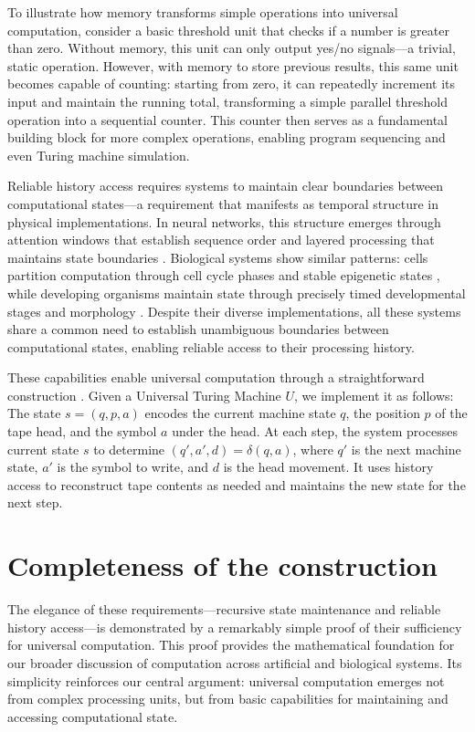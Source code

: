 \documentclass[12pt]{article}
\begin{document}
To illustrate how memory transforms simple operations into universal computation, consider a basic threshold unit that checks if a number is greater than zero.
Without memory, this unit can only output yes/no signals---a trivial, static operation.
However, with memory to store previous results, this same unit becomes capable of counting: starting from zero, it can repeatedly increment its input and maintain the running total, transforming a simple parallel threshold operation into a sequential counter.
This counter then serves as a fundamental building block for more complex operations, enabling program sequencing and even Turing machine simulation.

Reliable history access requires systems to maintain clear boundaries between computational states---a requirement that manifests as temporal structure in physical implementations.
In neural networks, this structure emerges through attention windows that establish sequence order and layered processing that maintains state boundaries \cite{martini2015information,quentin2019differential}.
Biological systems show similar patterns: cells partition computation through cell cycle phases and stable epigenetic states \cite{bruno2022epigenetic}, while developing organisms maintain state through precisely timed developmental stages and morphology \cite{turing1952chemical}.
Despite their diverse implementations, all these systems share a common need to establish unambiguous boundaries between computational states, enabling reliable access to their processing history.

These capabilities enable universal computation through a straightforward construction \cite{deutsch1995universality,bennett1989time}.
Given a Universal Turing Machine $U$, we implement it as follows: The state $s = (q, p, a)$ encodes the current machine state $q$, the position $p$ of the tape head, and the symbol $a$ under the head.
At each step, the system processes current state $s$ to determine $(q', a', d) = \delta(q, a)$, where $q'$ is the next machine state, $a'$ is the symbol to write, and $d$ is the head movement.
It uses history access to reconstruct tape contents as needed and maintains the new state for the next step.

\section{Completeness of the construction}

The elegance of these requirements---recursive state maintenance and reliable history access---is demonstrated by a remarkably simple proof of their sufficiency for universal computation.
This proof provides the mathematical foundation for our broader discussion of computation across artificial and biological systems.
Its simplicity reinforces our central argument: universal computation emerges not from complex processing units, but from basic capabilities for maintaining and accessing computational state.
\end{document}
